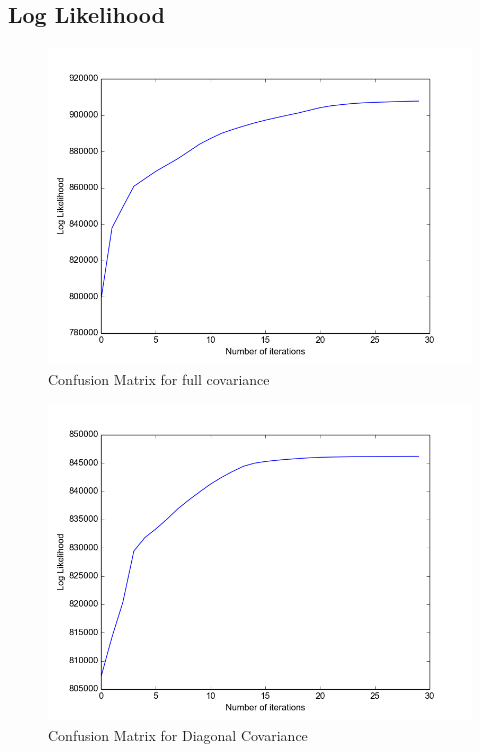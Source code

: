 \documentclass[11pt,a4paper]{article}
\begin{document}
\subsection{Log Likelihood}
\begin{minipage}[b]{0.5\textwidth}
\begin{figure}[H]
  \centering
  \includegraphics[width=.8\linewidth]{Figures/likelihood0.png}
  \caption{Confusion Matrix for full covariance}
  \label{fig:sfig1}
\end{figure}%
\end{minipage}
\begin{minipage}[b]{0.5\textwidth}
\begin{figure}[H]
  \centering
  \includegraphics[width=.8\linewidth]{Figures/likelihood1.png}
\caption{Confusion Matrix for Diagonal Covariance}
  \label{fig:sfig1}
\end{figure}%
\end{minipage}
\end{document}
